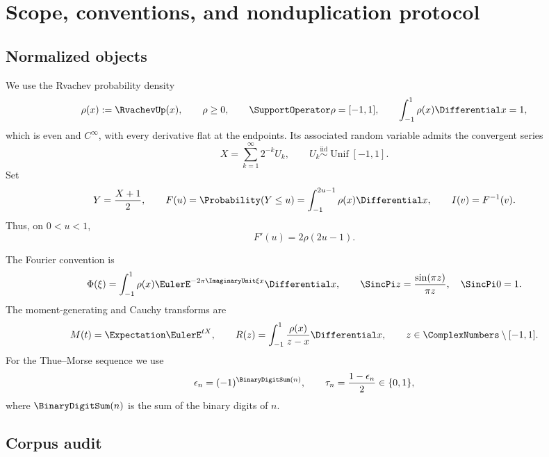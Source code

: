 \documentclass[11pt]{article}
\theoremstyle{definition}
\theoremstyle{remark}
\begin{document}
\clearpage

\section{Scope, conventions, and nonduplication protocol}
\label{p7:sec:scope}

\subsection{Normalized objects}

We use the Rvachev probability density
\[
 \rho(x):=\RvachevUp(x),\qquad \rho\ge0,\qquad
 \SupportOperator\rho=[-1,1],\qquad
 \int_{-1}^{1}\rho(x)\Differential x=1,
\]
which is even and \(C^\infty\), with every derivative flat at the endpoints. Its associated
random variable admits the convergent series
\begin{equation}
 X=\sum_{k=1}^{\infty}2^{-k}U_k,
 \qquad U_k\stackrel{\mathrm{iid}}{\sim}\operatorname{Unif}[-1,1].
 \label{p7:eq:X-random-series}
\end{equation}
Set
\[
 Y=\frac{X+1}{2},\qquad
 F(u)=\Probability(Y\le u)=\int_{-1}^{2u-1}\rho(x)\Differential x,
 \qquad I(v)=F^{-1}(v).
\]
Thus, on \(0<u<1\),
\begin{equation}
 F'(u)=2\rho(2u-1).
 \label{p7:eq:Fprime-rho}
\end{equation}

The Fourier convention is
\begin{equation}
 \Phi(\xi)=\int_{-1}^{1}\rho(x)\EulerE^{-2\pi\ImaginaryUnit\xi x}\Differential x,
 \qquad
 \SincPi z=\frac{\sin(\pi z)}{\pi z},\quad \SincPi 0=1.
 \label{p7:eq:fourier-convention}
\end{equation}
The moment-generating and Cauchy transforms are
\begin{equation}
 M(t)=\Expectation\EulerE^{tX},
 \qquad
 R(z)=\int_{-1}^{1}\frac{\rho(x)}{z-x}\Differential x,
 \qquad z\in\ComplexNumbers\setminus[-1,1].
 \label{p7:eq:M-R-defs}
\end{equation}
For the Thue--Morse sequence we use
\begin{equation}
 \epsilon_n=(-1)^{\BinaryDigitSum(n)},\qquad
 \tau_n=\frac{1-\epsilon_n}{2}\in\{0,1\},
 \label{p7:eq:TM-conventions}
\end{equation}
where \(\BinaryDigitSum(n)\) is the sum of the binary digits of \(n\).

\subsection{Corpus audit}
\end{document}
